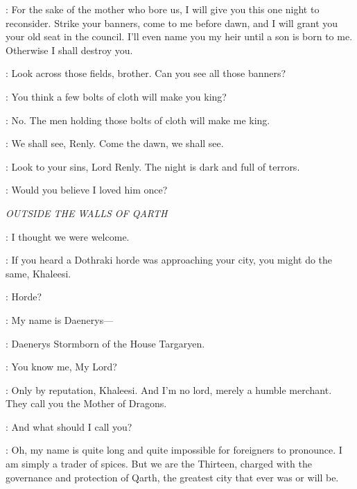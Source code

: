 \STANNIS: For the sake of the mother who bore us, I will give you this one night to reconsider. Strike your banners, come to me before dawn, and I will grant you your old seat in the council. I'll even name you my heir until a son is born to me. Otherwise I shall destroy you. 

\RENLY: Look across those fields, brother. Can you see all those banners? 

\STANNIS: You think a few bolts of cloth will make you king? 

\RENLY: No. The men holding those bolts of cloth will make me king. 

\STANNIS: We shall see, Renly. Come the dawn, we shall see. 

\MELISANDRE: Look to your sins, Lord Renly. The night is dark and full of terrors. 


\RENLY: Would you believe I loved him once? 



\scene

\textit{OUTSIDE THE WALLS OF QARTH}


\DAENERYS: I thought we were welcome. 

\JORAH: If you heard a Dothraki horde was approaching your city, you might do the same, Khaleesi. 

\DAENERYS: Horde? 



\DAENERYS: My name is Daenerys--- 

\SPICEKING:  Daenerys Stormborn of the House Targaryen. 

\DAENERYS: You know me, My Lord?

\SPICEKING: Only by reputation, Khaleesi. And I'm no lord, merely a humble merchant. They call you the Mother of Dragons. 

\DAENERYS: And what should I call you? 

\SPICEKING: Oh, my name is quite long and quite impossible for foreigners to pronounce. I am simply a trader of spices. But we are the Thirteen, charged with the governance and protection of Qarth, the greatest city that ever was or will be. 

